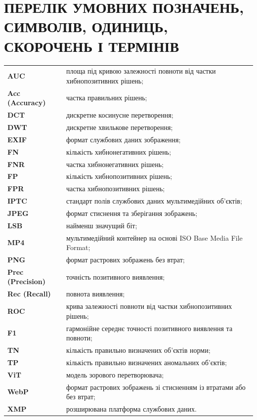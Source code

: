 \chapter*{ПЕРЕЛІК УМОВНИХ ПОЗНАЧЕНЬ, СИМВОЛІВ, ОДИНИЦЬ, СКОРОЧЕНЬ І ТЕРМІНІВ}

\begingroup
\small
\begin{longtable}{>{\bfseries}p{}p{}}
AUC & площа під кривою залежності повноти від частки хибнопозитивних рішень;\\
Acc (Accuracy) & частка правильних рішень;\\
DCT & дискретне косинусне перетворення;\\
DWT & дискретне хвилькове перетворення;\\
EXIF & формат службових даних зображення;\\
FN & кількість хибнонегативних рішень;\\
FNR & частка хибнонегативних рішень;\\
FP & кількість хибнопозитивних рішень;\\
FPR & частка хибнопозитивних рішень;\\
IPTC & стандарт полів службових даних мультимедійних об’єктів;\\
JPEG & формат стиснення та зберігання зображень;\\
LSB & найменш значущий біт;\\
MP4 & мультимедійний контейнер на основі ISO Base Media File Format;\\
PNG & формат растрових зображень без втрат;\\
Prec (Precision) & точність позитивного виявлення;\\
Rec (Recall) & повнота виявлення;\\
ROC & крива залежності повноти від частки хибнопозитивних рішень;\\
F1 & гармонійне середнє точності позитивного виявлення та повноти;\\
TN & кількість правильно визначених об’єктів норми;\\
TP & кількість правильно визначених аномальних об’єктів;\\
ViT & модель зорового перетворювача;\\
WebP & формат растрових зображень зі стисненням із втратами або без втрат;\\
XMP & розширювана платформа службових даних.\\
\end{longtable}
\endgroup

\clearpage
